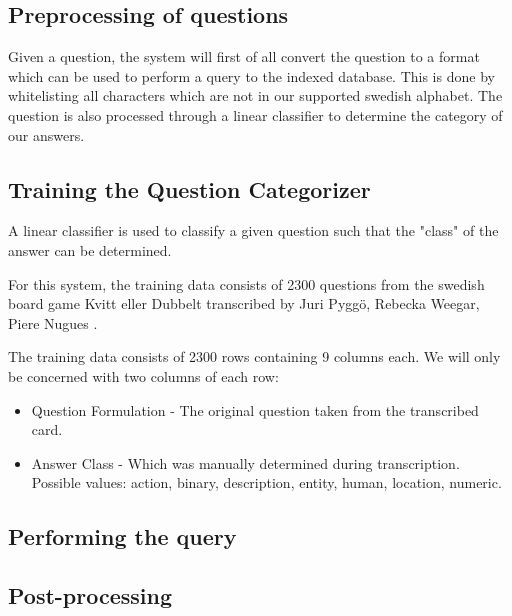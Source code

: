\subsection{Preprocessing of questions}
Given a question, the system will first of all convert the question
to a format which can be used to perform a query to the indexed
database. This is done by whitelisting all characters which
are not in our supported swedish alphabet. The question is also
processed through a linear classifier to determine the category of our 
answers.

\subsection{Training the Question Categorizer}
A linear classifier is used to classify a given question
such that the "class" of the answer can be determined.

For this system, the training data consists of 2300 questions 
from the swedish board game Kvitt eller Dubbelt transcribed 
by Juri Pygg\"o, Rebecka Weegar, Piere Nugues \cite{QASYS}.

The training data consists of 2300 rows containing 9 columns each.
We will only be concerned with two columns of each row:
\begin{itemize}
\item Question Formulation - The original question taken from the transcribed
  card.
\item Answer Class - Which was manually determined during transcription. 
  Possible values: action, binary, description, entity, human, location, numeric.
\end{itemize}


\subsection{Performing the query}
\subsection{Post-processing}
